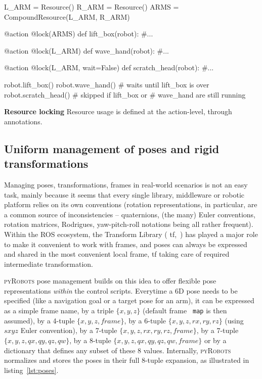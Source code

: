 \documentclass[a4paper, 10pt, conference]{ieeeconf}      %
\newcommand{\pyRobots}{\textsc{pyRobots}}
\begin{document}
\begin{listing}[H]
\begin{pythoncode}
    L_ARM = Resource()
    R_ARM = Resource()
    ARMS = CompoundResource(L_ARM, R_ARM)

    @action
    @lock(ARMS)
    def lift_box(robot):
        #...

    @action
    @lock(L_ARM)
    def wave_hand(robot):
        #...

    @action
    @lock(L_ARM, wait=False)
    def scratch_head(robot):
        #...

    robot.lift_box()
    robot.wave_hand() # waits until lift_box is over
    robot.scratch_head() # skipped if lift_box or
                         # wave_hand are still running

\end{pythoncode}
\caption{\textbf{Resource locking} Resource usage is defined at the
action-level, through annotations.}

\label{lst:resources}
\end{listing}



\subsection{Uniform management of poses and rigid transformations}

Managing poses, transformations, frames in real-world scenarios is not an easy
task, mainly because it seems that every single library, middleware or robotic
platform relies on its own conventions (rotation representations, in particular,
are a common source of inconsistencies -- quaternions, (the many) Euler
conventions, rotation matrices, Rodrigues, yaw-pitch-roll notations being all
rather frequent). Within the ROS ecosystem, the Transform Library ({\sc
tf},~\cite{foote2013tf}) has played a major role to make it convenient to work
with frames, and poses can always be expressed and shared in the most convenient
local frame, {\sc tf} taking care of required intermediate transformation.

\pyRobots{} pose management builds on this idea to offer flexible pose
representations \emph{within} the control scripts. Everytime a 6D pose needs to
be specified (like a navigation goal or a target pose for an arm), it can be
expressed as a simple frame name, by a triple $\{x, y, z\}$ (default frame {\tt
map} is then assumed), by a 4-tuple $\{x, y, z, frame\}$, by a 6-tuple $\{x, y,
z, rx, ry, rz\}$ (using $sxyz$ Euler convention), by a 7-tuple $\{x, y, z, rx,
ry, rz, frame\}$, by a 7-tuple $\{x, y, z, qx, qy, qz, qw\}$, by a 8-tuple $\{x,
y, z, qx, qy, qz, qw, frame\}$ or by a dictionary that defines any subset of
these 8 values.  Internally, \pyRobots{} normalizes and stores the poses in
their full 8-tuple expansion, as illustrated in listing~\ref{lst:poses}.
\end{document}
